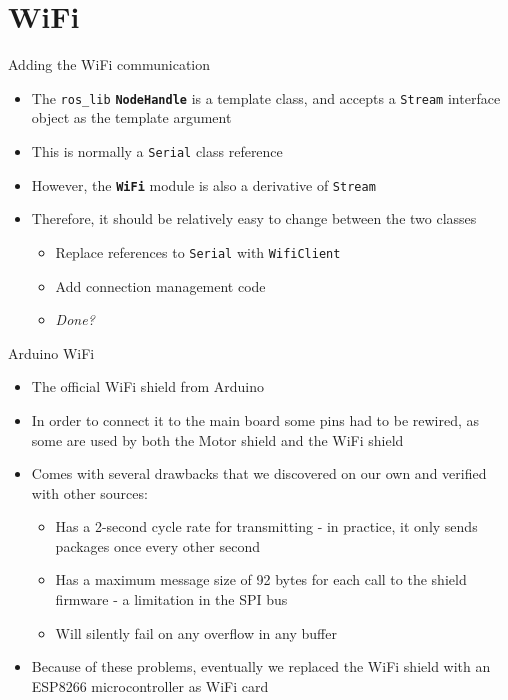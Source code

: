 \documentclass[12pt]{beamer}
\begin{document}
\section{WiFi}
\begin{frame}{Adding the WiFi communication}
\begin{itemize}
\item<+-> The \texttt{ros\_lib} \textbf{\texttt{NodeHandle}} is a template class, and accepts a \texttt{Stream} interface object as the template argument
\item<+-> This is normally a \texttt{Serial} class reference
\item<+-> However, the \texttt{\textbf{WiFi}} module is also a derivative of \texttt{Stream}
\item<+-> Therefore, it should be relatively easy to change between the two classes  
\begin{itemize}
	\item<+-> Replace references to \texttt{Serial} with \texttt{WifiClient}
	\item<+-> Add connection management code
	\item<+-> \emph{Done?}
\end{itemize}
\end{itemize}
\end{frame}
\begin{frame}{Arduino WiFi}
  \begin{itemize}
  \item<+-> The official WiFi shield from Arduino \cite{wifishield}
  \item<+-> In order to connect it to the main board some pins had to be rewired, as some are used by both the Motor shield and the WiFi shield
  \item<+-> Comes with several drawbacks that we discovered on our own and verified with other sources:
    \begin{itemize}
    \item<+-> Has a 2-second cycle rate for transmitting - in practice, it only sends packages once every other second
    \item<+-> Has a maximum message size of 92 bytes for each call to the shield firmware - a limitation in the SPI bus
    \item<+-> Will silently fail on any overflow in any buffer \cite{wificard1, wificard2}
    \end{itemize}
    \item<+-> Because of these problems, eventually we replaced the WiFi shield with an ESP8266 microcontroller as WiFi card
  \end{itemize}
\end{frame}
\end{document}
